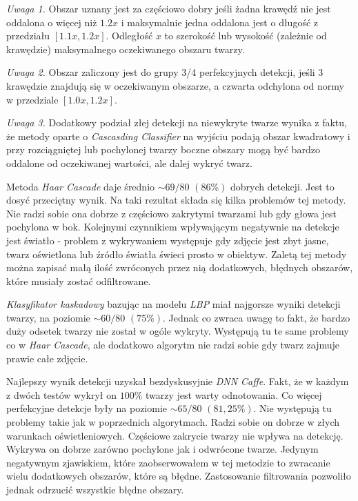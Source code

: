 \textit{Uwaga 1.}\label{uwaga:czesciowo_dobry} Obszar uznany jest za częściowo dobry jeśli żadna krawędź nie jest oddalona o więcej niż $1.2x$ i maksymalnie jedna oddalona jest o długość z przedziału $[1.1x, 1.2x]$. Odległość $x$ to szerokość lub wysokość (zależnie od krawędzie) maksymalnego oczekiwanego obszaru twarzy.
\par
\textit{Uwaga 2.}\label{uwaga:3_4_perfekcyjny} Obszar zaliczony jest do grupy 3/4 perfekcyjnych detekcji, jeśli 3 krawędzie znajdują się w oczekiwanym obszarze, a czwarta odchylona od normy w przedziale $[1.0x, 1.2x]$.
\par 
\textit{Uwaga 3.}\label{uwaga:dodatkowy_zle} Dodatkowy podział złej detekcji na niewykryte twarze wynika z faktu, że metody oparte o \textit{Cascasding Classifier} na wyjściu podają obszar kwadratowy i przy rozciągniętej lub pochylonej twarzy boczne obszary mogą być bardzo oddalone od oczekiwanej wartości, ale dalej wykryć twarz. 

\vspace{10mm}




Metoda \textit{Haar Cascade} daje średnio $\sim69/80$ $(86\%)$ dobrych detekcji. Jest to dosyć przeciętny wynik. Na taki rezultat składa się kilka problemów tej metody. Nie radzi sobie ona dobrze z częściowo zakrytymi twarzami lub gdy głowa jest pochylona w bok. Kolejnymi czynnikiem wpływającym negatywnie na detekcje jest światło - problem z wykrywaniem występuje gdy zdjęcie jest zbyt jasne, twarz oświetlona lub źródło światła świeci prosto w obiektyw. Zaletą tej metody można zapisać małą ilość zwróconych przez nią dodatkowych, błędnych obszarów, które musiały zostać odfiltrowane.

\par
\textit{Klasyfikator kaskadowy} bazując na modelu \textit{LBP} miał najgorsze wyniki detekcji twarzy, na poziomie $\sim60/80$ $(75 \%)$. Jednak co zwraca uwagę to fakt, że bardzo duży odsetek twarzy nie został w ogóle wykryty. Występują tu te same problemy co w \textit{Haar Cascade}, ale dodatkowo algorytm nie radzi sobie gdy twarz zajmuje prawie całe zdjęcie.

\par
Najlepszy wynik detekcji uzyskał bezdyskusyjnie \textit{DNN Caffe}. Fakt, że w każdym z dwóch testów wykrył on $100 \%$ twarzy jest warty odnotowania. Co więcej perfekcyjne detekcje były na poziomie $\sim65/80$ $(81,25 \%)$. Nie występują tu problemy takie jak w poprzednich algorytmach. Radzi sobie on dobrze w złych warunkach oświetleniowych. Częściowe zakrycie twarzy nie wpływa na detekcję. Wykrywa on dobrze zarówno pochylone jak i odwrócone twarze. Jedynym negatywnym zjawiskiem, które zaobserwowałem w tej metodzie to zwracanie wielu dodatkowych obszarów, które są błędne. Zastosowanie filtrowania pozwoliło jednak odrzucić wszystkie błędne obszary.

